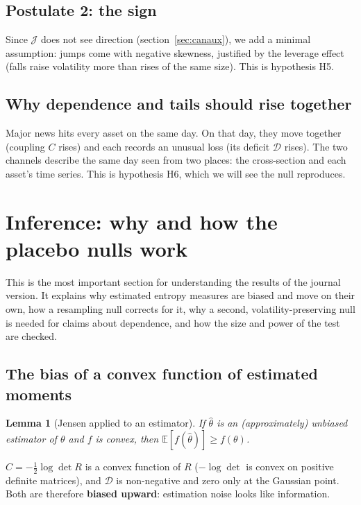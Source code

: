\documentclass[11pt]{article}
\theoremstyle{plain}
\newtheorem{lemme}[proposition]{Lemma}
\theoremstyle{definition}
\theoremstyle{remark}
\newcommand{\JJ}{\mathcal{J}}
\newcommand{\DD}{\mathcal{D}}
\newcommand{\E}{\mathbb{E}}
\begin{document}
\subsection{Postulate 2: the sign}

Since $\JJ$ does not see direction (section~\ref{sec:canaux}), we add a
minimal assumption: jumps come with negative skewness, justified by the
leverage effect (falls raise volatility more than rises of the same size).
This is hypothesis H5.

\subsection{Why dependence and tails should rise together}

Major news hits every asset on the same day. On that day, they move together
(coupling $C$ rises) and each records an unusual loss (its deficit $\DD$
rises). The two channels describe the same day seen from two places: the
cross-section and each asset's time series. This is hypothesis H6, which we
will see the null reproduces.

\section{Inference: why and how the placebo nulls work}
\label{sec:temoin}

This is the most important section for understanding the results of the
journal version. It explains why estimated entropy measures are biased and
move on their own, how a resampling null corrects for it, why a second,
volatility-preserving null is needed for claims about dependence, and how the
size and power of the test are checked.

\subsection{The bias of a convex function of estimated moments}

\begin{lemme}[Jensen applied to an estimator]
If $\hat\theta$ is an (approximately) unbiased estimator of $\theta$ and $f$
is convex, then $\E[f(\hat\theta)]\ge f(\theta)$.
\end{lemme}

\noindent $C=-\tfrac12\log\det R$ is a convex function of $R$ ($-\log\det$ is
convex on positive definite matrices), and $\DD$ is non-negative and zero only
at the Gaussian point. Both are therefore \textbf{biased upward}: estimation
noise looks like information.
\end{document}
